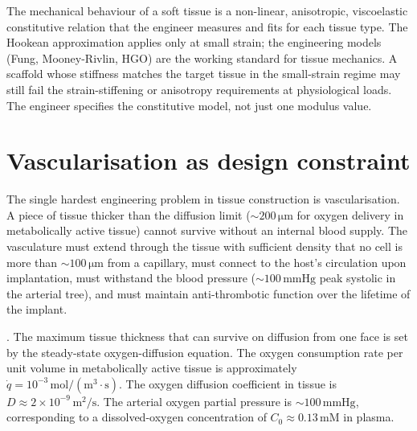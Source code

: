 \begin{principle}
The mechanical behaviour of a soft tissue is a non-linear, anisotropic,
viscoelastic constitutive relation that the engineer measures and
fits for each tissue type. The Hookean approximation applies only at
small strain; the engineering models (Fung, Mooney-Rivlin, HGO) are
the working standard for tissue mechanics. A scaffold whose stiffness
matches the target tissue in the small-strain regime may still fail
the strain-stiffening or anisotropy requirements at physiological
loads. The engineer specifies the constitutive model, not just one
modulus value.
\end{principle}

\section{Vascularisation as design constraint}

The single hardest engineering problem in tissue construction is
vascularisation. A piece of tissue thicker than the diffusion limit
($\sim 200\,\si{\micro\meter}$ for oxygen delivery in metabolically
active tissue) cannot survive without an internal blood supply. The
vasculature must extend through the tissue with sufficient density
that no cell is more than $\sim 100\,\si{\micro\meter}$ from a
capillary, must connect to the host's circulation upon implantation,
must withstand the blood pressure ($\sim 100\,\text{mmHg}$ peak
systolic in the arterial tree), and must maintain anti-thrombotic
function over the lifetime of the implant.

. The maximum tissue thickness that can
survive on diffusion from one face is set by the steady-state
oxygen-diffusion equation. The oxygen consumption rate per unit
volume in metabolically active tissue is approximately
$\dot{q} = 10^{-3}\,\text{mol}/(\text{m}^3\cdot\text{s})$. The
oxygen diffusion coefficient in tissue is $D \approx 2 \times 10^{-9}\,
\text{m}^2/\text{s}$. The arterial oxygen partial pressure is
$\sim 100\,\text{mmHg}$, corresponding to a dissolved-oxygen
concentration of $C_0 \approx 0.13\,\text{mM}$ in plasma.

